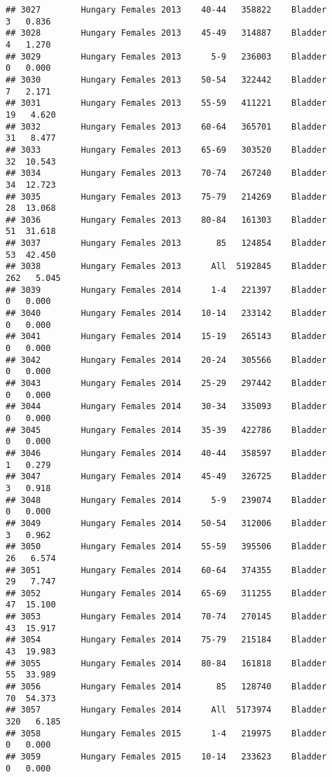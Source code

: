 \documentclass[
]{article}
\begin{document}
\begin{verbatim}
## 3027        Hungary Females 2013    40-44   358822    Bladder      3   0.836
## 3028        Hungary Females 2013    45-49   314887    Bladder      4   1.270
## 3029        Hungary Females 2013      5-9   236003    Bladder      0   0.000
## 3030        Hungary Females 2013    50-54   322442    Bladder      7   2.171
## 3031        Hungary Females 2013    55-59   411221    Bladder     19   4.620
## 3032        Hungary Females 2013    60-64   365701    Bladder     31   8.477
## 3033        Hungary Females 2013    65-69   303520    Bladder     32  10.543
## 3034        Hungary Females 2013    70-74   267240    Bladder     34  12.723
## 3035        Hungary Females 2013    75-79   214269    Bladder     28  13.068
## 3036        Hungary Females 2013    80-84   161303    Bladder     51  31.618
## 3037        Hungary Females 2013       85   124854    Bladder     53  42.450
## 3038        Hungary Females 2013      All  5192845    Bladder    262   5.045
## 3039        Hungary Females 2014      1-4   221397    Bladder      0   0.000
## 3040        Hungary Females 2014    10-14   233142    Bladder      0   0.000
## 3041        Hungary Females 2014    15-19   265143    Bladder      0   0.000
## 3042        Hungary Females 2014    20-24   305566    Bladder      0   0.000
## 3043        Hungary Females 2014    25-29   297442    Bladder      0   0.000
## 3044        Hungary Females 2014    30-34   335093    Bladder      0   0.000
## 3045        Hungary Females 2014    35-39   422786    Bladder      0   0.000
## 3046        Hungary Females 2014    40-44   358597    Bladder      1   0.279
## 3047        Hungary Females 2014    45-49   326725    Bladder      3   0.918
## 3048        Hungary Females 2014      5-9   239074    Bladder      0   0.000
## 3049        Hungary Females 2014    50-54   312006    Bladder      3   0.962
## 3050        Hungary Females 2014    55-59   395506    Bladder     26   6.574
## 3051        Hungary Females 2014    60-64   374355    Bladder     29   7.747
## 3052        Hungary Females 2014    65-69   311255    Bladder     47  15.100
## 3053        Hungary Females 2014    70-74   270145    Bladder     43  15.917
## 3054        Hungary Females 2014    75-79   215184    Bladder     43  19.983
## 3055        Hungary Females 2014    80-84   161818    Bladder     55  33.989
## 3056        Hungary Females 2014       85   128740    Bladder     70  54.373
## 3057        Hungary Females 2014      All  5173974    Bladder    320   6.185
## 3058        Hungary Females 2015      1-4   219975    Bladder      0   0.000
## 3059        Hungary Females 2015    10-14   233623    Bladder      0   0.000

\end{verbatim}
\end{document}
